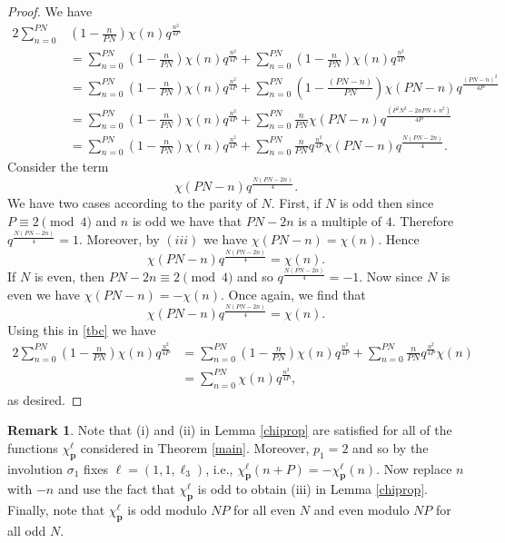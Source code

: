 \documentclass[11pt,reqno]{amsart}
\theoremstyle{definition}
\newtheorem{remark}[theorem]{Remark}
\numberwithin{equation}{section}
\renewcommand{\=}{\;=\;}
\begin{document}
\begin{proof}
We have 
\begin{align}
2\sum_{n=0}^{PN}& \left(1-\frac{n}{PN}\right) \chi(n) q^{\frac{n^2}{4P}} \nonumber \\
&= \sum_{n=0}^{PN} \left(1-\frac{n}{PN}\right) \chi(n) q^{\frac{n^2}{4P}} + \sum_{n=0}^{PN} \left(1-\frac{n}{PN}\right) \chi(n) q^{\frac{n^2}{4P}} \nonumber \\
&= \sum_{n=0}^{PN} \left(1-\frac{n}{PN}\right) \chi(n) q^{\frac{n^2}{4P}}  + \sum_{n=0}^{PN} \left(1-\frac{(PN-n)}{PN}\right) \chi(PN-n) q^{\frac{(PN-n)^2}{4P}} \nonumber \\
&= \sum_{n=0}^{PN} \left(1-\frac{n}{PN}\right) \chi(n) q^{\frac{n^2}{4P}}  + \sum_{n=0}^{PN} \frac{n}{PN} \chi(PN-n) q^{\frac{(P^2N^2 - 2nPN + n^2)}{4P}} \nonumber \\
&= \sum_{n=0}^{PN} \left(1-\frac{n}{PN}\right) \chi(n) q^{\frac{n^2}{4P}}  + \sum_{n=0}^{PN} \frac{n}{PN} q^{\frac{n^2}{4P}} \chi(PN-n) q^{\frac{N(PN - 2n)}{4}}. \label{tbc}
\end{align}
Consider the term
$$
\chi(PN-n) q^{\frac{N(PN - 2n)}{4}}.
$$
We have two cases according to the parity of $N$.    First, if $N$ is odd then since $P \equiv 2 \pmod{4}$ and $n$ is odd we have that $PN-2n$ is a multiple of $4$.    Therefore $q^{\frac{N(PN - 2n)}{4}} = 1$.   Moreover, by $(iii)$ we have $\chi(PN - n) =\chi(n)$.    Hence
$$
\chi(PN-n) q^{\frac{N(PN - 2n)}{4}} = \chi(n).
$$
If $N$ is even, then $PN-2n \equiv 2 \pmod{4}$ and so $q^{\frac{N(PN - 2n)}{4}} = -1$. Now since $N$ is even we have $\chi(PN - n) = -\chi(n)$.   Once again, we find that 
$$
\chi(PN-n) q^{\frac{N(PN - 2n)}{4}} = \chi(n).
$$ 
Using this in \eqref{tbc} we have
\begin{align*}
2\sum_{n=0}^{PN} \left(1-\frac{n}{PN}\right) \chi(n) q^{\frac{n^2}{4P}} &= \sum_{n=0}^{PN} \left(1-\frac{n}{PN}\right) \chi(n) q^{\frac{n^2}{4P}}  + \sum_{n=0}^{PN} \frac{n}{PN} q^{\frac{n^2}{4P}} \chi(n) \\
&= \sum_{n=0}^{PN} \chi(n) q^{\frac{n^2}{4P}},
\end{align*}
as desired.
\end{proof}

\begin{remark}\label{chiproprmk}
Note that (i) and (ii) in Lemma \ref{chiprop} are satisfied for all of the functions $\chi_{\bm{p}}^{\bm{\ell}}$ considered in Theorem \ref{main}. Moreover, $p_1 = 2$ and so by \cite[(3.8)]{hikami3} the involution $\sigma_1$ fixes $\bm{\ell} = (1,1,\ell_3)$, i.e., $\chi_{\bm{p}}^{\bm{\ell}}(n+P) = -\chi_{\bm{p}}^{\bm{\ell}}(n)$. Now replace $n$ with $-n$ and use the fact that $\chi_{\bm{p}}^{\bm{\ell}}$ is odd to obtain (iii) in Lemma \ref{chiprop}. Finally, note that $\chi_{\bm{p}}^{\bm{\ell}}$ is odd modulo $NP$ for all even $N$ and even modulo $NP$ for all odd $N$.    
\end{remark}
\end{document}
